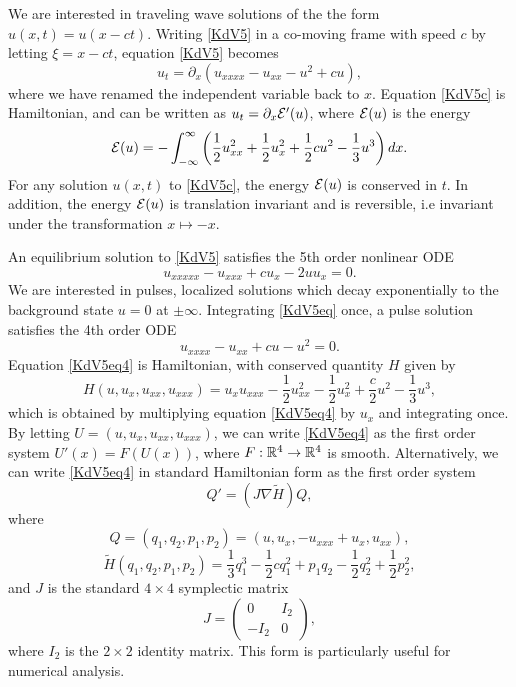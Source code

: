 \documentclass[11pt,reqno]{amsart}
\theoremstyle{plain}
\theoremstyle{definition}
\theoremstyle{remark}
\begin{document}
We are interested in traveling wave solutions of the the form $u(x, t) = u(x - ct)$. Writing \cref{KdV5} in a co-moving frame with speed $c$ by letting $\xi = x - ct$, equation \cref{KdV5} becomes
\begin{equation}\label{KdV5c}
u_t = \partial_x(u_{xxxx} - u_{xx} - u^2 + cu) ,
\end{equation}
where we have renamed the independent variable back to $x$. Equation \cref{KdV5c} is Hamiltonian, and can be written as $u_t = \partial_x \mathcal{E}'(u)$, where $\mathcal{E}(u)$ is the energy
\begin{equation}\label{KdV5energy}
\mathcal{E}(u) = -\int_{-\infty}^{\infty} \left( \frac{1}{2}u_{xx}^2 + \frac{1}{2}u_x^2 + \frac{1}{2}cu^2 - \frac{1}{3}u^3 \right) dx.
\end{equation}
For any solution $u(x, t)$ to \cref{KdV5c}, the energy $\mathcal{E}(u)$ is conserved in $t$. In addition, the energy $\mathcal{E}(u)$ is translation invariant and is reversible, i.e invariant under the transformation $x \mapsto -x$.

An equilibrium solution to \cref{KdV5} satisfies the 5th order nonlinear ODE
\begin{equation}\label{KdV5eq}
u_{xxxxx} - u_{xxx} + c u_x - 2 u u_x = 0.
\end{equation}
We are interested in pulses, localized solutions which decay exponentially to the background state $u = 0$ at $\pm \infty$. Integrating \cref{KdV5eq} once, a pulse solution satisfies the 4th order ODE
\begin{equation}\label{KdV5eq4}
u_{xxxx} - u_{xx} + c u - u^2 = 0.
\end{equation}
Equation \cref{KdV5eq4} is Hamiltonian, with conserved quantity $H$ given by
\begin{equation}\label{KdV5ham}
H(u, u_x, u_{xx}, u_{xxx}) = u_x u_{xxx} - \frac{1}{2}u_{xx}^2 - \frac{1}{2}u_x^2 + \frac{c}{2}u^2 - \frac{1}{3}u^3,
\end{equation}
which is obtained by multiplying equation \cref{KdV5eq4} by $u_x$ and integrating once. By letting $U = (u, u_x, u_{xx}, u_{xxx})$, we can write \cref{KdV5eq4} as the first order system $U'(x) = F(U(x))$, where $F: \mathbb{R}^4 \rightarrow \mathbb{R}^4$ is smooth. Alternatively, we can write \cref{KdV5eq4} in standard Hamiltonian form as the first order system
\begin{equation}\label{KdV5ham2}
Q' = (J \nabla \tilde{H}) Q,
\end{equation}
where 
\begin{equation}\label{KdV5Q}
Q = (q_1, q_2, p_1, p_2) = (u, u_x, -u_{xxx} + u_x, u_{xx}),
\end{equation}
\begin{equation}
\tilde{H}(q_1, q_2, p_1, p_2) = \frac{1}{3}q_1^3 - \frac{1}{2}c q_1^2 + p_1 q_2 - \frac{1}{2}q_2^2 + \frac{1}{2}p_2^2,
\end{equation}
and $J$ is the standard $4 \times 4$ symplectic matrix
\[
J = \begin{pmatrix}
0 & I_2 \\ -I_2 & 0
\end{pmatrix},
\]
where $I_2$ is the $2\times 2$ identity matrix. This form is particularly useful for numerical analysis.
\end{document}
